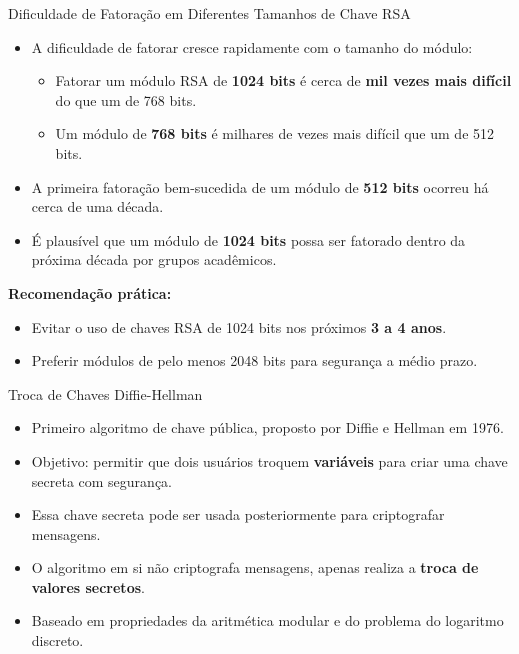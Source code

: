 \begin{frame}{Dificuldade de Fatoração em Diferentes Tamanhos de Chave RSA}
  \begin{itemize}
    \item A dificuldade de fatorar cresce rapidamente com o tamanho do módulo:
          \begin{itemize}
            \item Fatorar um módulo RSA de \textbf{1024 bits} é cerca de \textbf{mil vezes mais difícil} do que um de 768 bits.
            \item Um módulo de \textbf{768 bits} é milhares de vezes mais difícil que um de 512 bits.
          \end{itemize}
    \item A primeira fatoração bem-sucedida de um módulo de \textbf{512 bits} ocorreu há cerca de uma década.
    \item É plausível que um módulo de \textbf{1024 bits} possa ser fatorado dentro da próxima década por grupos acadêmicos.
  \end{itemize}

  \medskip
  \textbf{Recomendação prática:}
  \begin{itemize}
    \item Evitar o uso de chaves RSA de 1024 bits nos próximos \textbf{3 a 4 anos}.
    \item Preferir módulos de pelo menos \alert{2048 bits} para segurança a médio prazo.
  \end{itemize}
\end{frame}


\begin{frame}{Troca de Chaves Diffie-Hellman}
  \begin{itemize}
    \item Primeiro algoritmo de chave pública, proposto por Diffie e Hellman em 1976.
    \item Objetivo: permitir que dois usuários troquem \textbf{variáveis} para criar uma chave secreta com segurança.
    \item Essa chave secreta pode ser usada posteriormente para criptografar mensagens.
    \item O algoritmo em si não criptografa mensagens, apenas realiza a \textbf{troca de valores secretos}.
    \item Baseado em propriedades da aritmética modular e do problema do logaritmo discreto.
  \end{itemize}
\end{frame}

